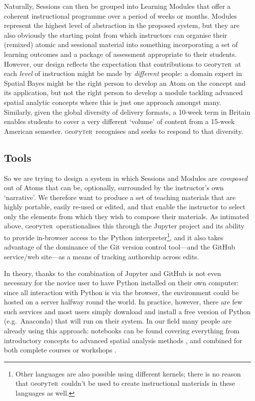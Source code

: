 \documentclass[letter, 11pt,titlepage]{article}
\newcommand{\gp}{\textsc{g}eo\textsc{p}y\textsc{t}e\textsc{r}~\/}
\newcommand{\eg}{e.g.~\/}
\begin{document}
Naturally, Sessions can then be grouped into Learning Modules that offer a coherent instructional programme over a period of weeks or months. Modules represent the highest level of abstraction in the proposed system, but they are also obviously the starting point from which instructors can organise their (remixed) atomic and sessional material into something incorporating a set of learning outcomes and a package of assessment appropriate to their students. However, our design reflects the expectation that contributions to \gp at each \emph{level} of instruction might be made by \emph{different} people: a domain expert in Spatial Bayes might be the right person to develop an Atom on the concept and its application, but not the right person to develop a module tackling advanced spatial analytic concepts where this is just one approach amongst many. Similarly, given the global diversity of delivery formats, a 10-week term in Britain enables students to cover a very different `volume' of content from a 15-week American semester. \gp recognises and seeks to respond to that diversity.

\subsection{Tools}\label{tools}

So we are trying to design a system in which Sessions and Modules are \emph{composed} out of Atoms that can be, optionally, surrounded by the instructor's own `narrative'. We therefore want to produce a set of teaching materials that are highly portable, easily re-used or edited, and that enable the instructor to select only the elements from which they wish to compose their materials. As intimated above, \gp operationalises this through the Jupyter project and its ability to provide in-browser access to the Python interpreter\footnote{Other languages are also possible using different kernels; there is no reason that \gp couldn't be used to create instructional materials in these languages as well.}, and it also takes advantage of the dominance of the Git version control tool---and the GitHub service/web site---as a means of tracking authorship across edits.

In theory, thanks to the combination of Jupyter and GitHub is not even necessary
for the novice user to have Python installed on their own computer: since all
interaction with Python is via the browser, the environment could be hosted on a
server halfway round the world. In practice, however, there are few such
services and most users simply download and install a free version of Python
(\eg Anaconda) that will run on their system. In our field many people are
already using this approach: notebooks can be found covering everything from
introductory concepts \citep{millington_reades_2017_code} to advanced spatial
analysis methods \citep{darribas_gds15}, and combined for both complete courses
or workshops \citep{rey_2016_narsc}.
\end{document}
